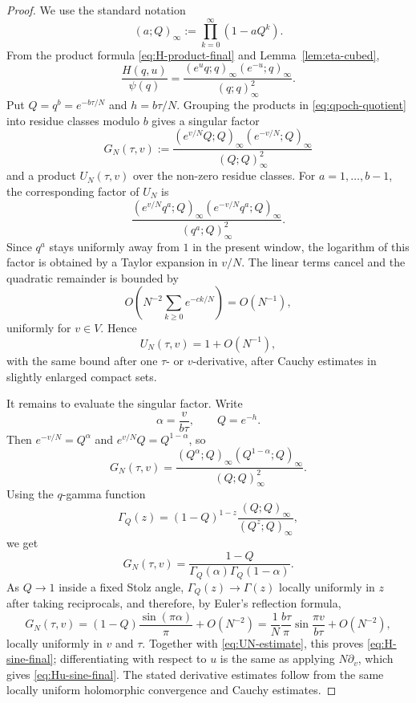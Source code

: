 \documentclass[10pt,a4paper]{amsart}
\newcommand{\qpoch}[2]{(#1;#2)_\infty}
\begin{document}
\begin{proof}
We use the standard notation
\[
        \qpoch{a}{Q}:=\prod_{k=0}^{\infty}(1-aQ^k).
\]
From the product formula \eqref{eq:H-product-final} and Lemma~\ref{lem:eta-cubed},
\begin{equation}\label{eq:qpoch-quotient}
        \frac{H(q,u)}{\psi(q)}=
        \frac{\qpoch{e^u q}{q}\qpoch{e^{-u}}{q}}{\qpoch{q}{q}^2}.
\end{equation}
Put $Q=q^b=e^{-b\tau/N}$ and $h=b\tau/N$.  Grouping the products in \eqref{eq:qpoch-quotient} into residue classes modulo $b$ gives a singular factor
\begin{equation}\label{eq:singular-factor}
        G_N(\tau,v):=
        \frac{\qpoch{e^{v/N}Q}{Q}\qpoch{e^{-v/N}}{Q}}{\qpoch{Q}{Q}^2}
\end{equation}
and a product $U_N(\tau,v)$ over the non-zero residue classes.  For $a=1,\ldots,b-1$, the corresponding factor of $U_N$ is
\[
        \frac{\qpoch{e^{v/N}q^a}{Q}\qpoch{e^{-v/N}q^a}{Q}}{\qpoch{q^a}{Q}^2}.
\]
Since $q^a$ stays uniformly away from $1$ in the present window, the logarithm of this factor is obtained by a Taylor expansion in $v/N$.  The linear terms cancel and the quadratic remainder is bounded by
\[
        O\left(N^{-2}\sum_{k\ge0}e^{-c k/N}\right)=O(N^{-1}),
\]
uniformly for $v\in V$.  Hence
\begin{equation}\label{eq:UN-estimate}
        U_N(\tau,v)=1+O(N^{-1}),
\end{equation}
with the same bound after one $\tau$- or $v$-derivative, after Cauchy estimates in slightly enlarged compact sets.

It remains to evaluate the singular factor.  Write
\[
        \alpha=\frac{v}{b\tau},
        \qquad Q=e^{-h}.
\]
Then $e^{-v/N}=Q^{\alpha}$ and $e^{v/N}Q=Q^{1-\alpha}$, so
\[
        G_N(\tau,v)=
        \frac{\qpoch{Q^\alpha}{Q}\qpoch{Q^{1-\alpha}}{Q}}{\qpoch{Q}{Q}^2}.
\]
Using the $q$-gamma function
\[
        \Gamma_Q(z)=(1-Q)^{1-z}\frac{\qpoch{Q}{Q}}{\qpoch{Q^z}{Q}},
\]
we get
\[
        G_N(\tau,v)=\frac{1-Q}{\Gamma_Q(\alpha)\Gamma_Q(1-\alpha)}.
\]
As $Q\to1$ inside a fixed Stolz angle, $\Gamma_Q(z)\to\Gamma(z)$ locally uniformly in $z$ after taking reciprocals, and therefore, by Euler's reflection formula,
\[
        G_N(\tau,v)=
        (1-Q)\frac{\sin(\pi\alpha)}{\pi}
        +O(N^{-2})
        =\frac1N\frac{b\tau}{\pi}\sin\frac{\pi v}{b\tau}
          +O(N^{-2}),
\]
locally uniformly in $v$ and $\tau$.  Together with \eqref{eq:UN-estimate}, this proves \eqref{eq:H-sine-final}; differentiating with respect to $u$ is the same as applying $N\partial_v$, which gives \eqref{eq:Hu-sine-final}.  The stated derivative estimates follow from the same locally uniform holomorphic convergence and Cauchy estimates.


\end{proof}
\end{document}
